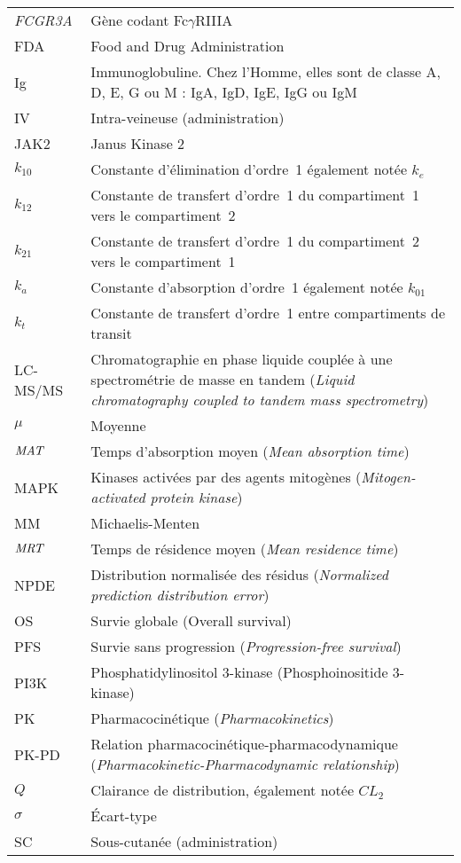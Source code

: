 \begin{tabularx}{30em}{X X}
\textit{FCGR3A} & 	Gène codant Fc$\gamma$RIIIA\\
FDA & 	Food and Drug Administration\\
Ig & 	Immunoglobuline. Chez l'Homme, elles sont de classe A, D, E, G ou M : IgA, IgD, IgE, IgG ou IgM \\
IV & 	Intra-veineuse (administration)\\
JAK2 & 	Janus Kinase 2\\
$k_{10}$ & 	Constante d'élimination d'ordre~1 également notée $k_e$\\
$k_{12}$ & 	Constante de transfert d'ordre~1 du compartiment~1 vers le compartiment~2\\
$k_{21}$ & 	Constante de transfert d'ordre~1 du compartiment~2 vers le compartiment~1\\
$k_a$ & 	Constante d'absorption d'ordre~1 également notée $k_{01}$\\
$k_t$ & 	Constante de transfert d'ordre~1 entre compartiments de transit\\
LC-MS/MS & 	Chromatographie en phase liquide couplée à une spectrométrie de masse en tandem (\textit{Liquid chromatography coupled to tandem mass spectrometry})\\
$\mu$ & 	Moyenne\\
$\operatorname{\textit{MAT}}$ & 	Temps d'absorption moyen (\textit{Mean absorption time})\\
MAPK & 	Kinases activées par des agents mitogènes (\textit{Mitogen-activated protein kinase})\\
MM & 	Michaelis-Menten\\
$\operatorname{\textit{MRT}}$ & 	Temps de résidence moyen (\textit{Mean residence time})\\
NPDE & 	Distribution normalisée des résidus (\textit{Normalized prediction distribution error})\\
OS & 	Survie globale (Overall survival)\\
PFS & 	Survie sans progression (\textit{Progression-free survival})\\
PI3K & 	Phosphatidylinositol 3-kinase (Phosphoinositide 3-kinase)\\
PK & 	Pharmacocinétique (\textit{Pharmacokinetics})\\
PK-PD & 	Relation pharmacocinétique-pharmacodynamique (\textit{Pharmacokinetic-Pharmacodynamic relationship})\\
$Q$ & 	Clairance de distribution, également notée $CL_2$\\
$\sigma$ & 	Écart-type\\
SC & 	Sous-cutanée (administration)\\

\end{tabularx}
